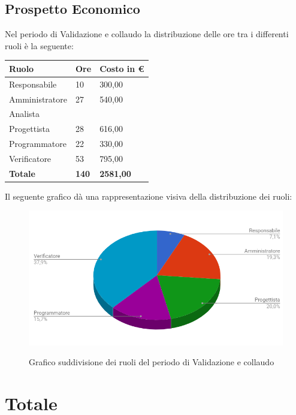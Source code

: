 \documentclass[PianoDiProgetto.tex]{subfiles}
\begin{document}
\subsection{Prospetto Economico}
Nel periodo di Validazione e collaudo la distribuzione delle ore tra i differenti ruoli è la seguente:\begin{center}
	\begin{table}[htbp]
		\centering
		\renewcommand\arraystretch{1.5}
		\begin{tabularx}{\textwidth}{p{5cm}|p{4cm}|p{4cm}}
			\hline
			\textbf{Ruolo} & \textbf{Ore} & \textbf{Costo in \euro} \\
			\hline
			Responsabile & 10 & 300,00 \\
			\hline
			Amministratore & 27 & 540,00 \\
			\hline
			Analista & \ & \ \\
			\hline
			Progettista & 28 & 616,00 \\
			\hline
			Programmatore & 22 & 330,00 \\
			\hline
			Verificatore & 53 & 795,00 \\
			\hline
			\textbf{Totale} & \textbf{140} & \textbf{2581,00}\\
			\hline
		\end{tabularx}
	\end{table} 
\end{center}
Il seguente grafico dà una rappresentazione visiva della distribuzione dei ruoli:
\begin{figure}[h]
	\includegraphics[width=12.5cm]{images/prospettoEconomico/valCol.png}
	\label{fig:foo}
	\caption{Grafico suddivisione dei ruoli del periodo di Validazione e collaudo}
\end{figure} 
\clearpage
\section{Totale}
\end{document}

